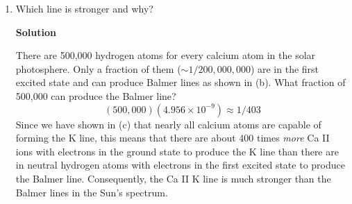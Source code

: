 \documentclass[12pt]{article}
\begin{document}
\begin{enumerate}[label=(\alph*)]
\begin{adjustwidth}{2.5em}{0pt}
\begin{siderules}
{Now we consider the ratio of calcium ions in the excited to the ground state. The energy difference between this first excited state and ground state is 3.12 eV as given, with degeneracies of $g_1 = 2$ and $g_2 = 4$.
\begin{equation*}
\left[\frac{N_2}{N_1}\right]_{Ca II} = \frac{g_2}{g_1} e^{-(E_2 - E_1)/kT} \approx \frac{1}{265}
\end{equation*}
This means that one Ca II ion is in the excited state out of every 265 atoms and are capable of producing the Ca II K line. Now, we can see that almost all of the calcium atoms in the photosphere are in the ground state by computing its fraction:
\begin{equation}
\frac{N_1}{N_{total}} = \left(\frac{1}{1+[N_2/N_1]_{Ca II}}\right)\left(\frac{[N_{II}/N_I]_{Ca II}}{1+[N_{II}/N_I]_{Ca II}}\right) = 0.995
\end{equation}
This indicates that the vast majority of calcium atoms are in the ground state.
 }
\end{siderules}
\end{adjustwidth}

\item Which line is stronger and why?

\vspace{0.5cm}
\begin{adjustwidth}{2.5em}{0pt}
\begin{siderules}
 {\color{blue} \textbf{Solution}
 
There are 500,000 hydrogen atoms for every calcium atom in the solar photosphere. Only a fraction of them ($\sim 1/200,000,000$) are in the first excited state and can produce Balmer lines as shown in (b). What fraction of 500,000 can produce the Balmer line?
\begin{equation}
(500,000)(4.956 \times 10^{-9}) \approx 1/403
\end{equation}
Since we have shown in (c) that nearly all calcium atoms are capable of forming the K line, this means that there are about 400 times \emph{more} Ca II ions with electrons in the ground state to produce the K line than there are in neutral hydrogen atoms with electrons in the first excited state to produce the Balmer line. Consequently, the Ca II K line is much stronger than the Balmer lines in the Sun's spectrum.
 }
\end{siderules}
\end{adjustwidth}
\end{enumerate}
\end{document}
